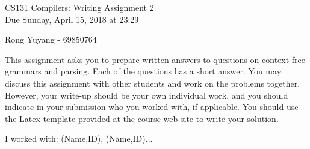 \documentclass[10pt]{article}
\begin{document}
\begin{center}
\Large CS131 Compilers: Writing Assignment 2\\Due Sunday, April 15, 2018 at 23:29
\end{center}

\begin{center}
\LARGE Rong Yuyang - 69850764
\end{center}

This assignment asks you to prepare written answers to questions on
context-free grammars and parsing. Each of the questions has a short answer. You
may discuss this assignment with other students and work on the problems
together. However, your write-up should be your own individual work.
and you should indicate in your submission who you worked with, if applicable. 
You should use the Latex template provided at the course web site to write your solution.

\begin{center}
I worked with: (Name,ID), (Name,ID)...
\end{center}
\end{document}
